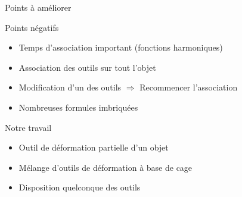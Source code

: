 \documentclass[xcolor=x11names,compress]{beamer}
\renewcommand{\(}{\begin{columns}} \renewcommand{\)}{\end{columns}}
\newcommand{\<}[1]{\begin{column}{#1}} \renewcommand{\>}{\end{column}}
\begin{document}
\begin{frame}{Points à améliorer}
  \begin{alertblock}{Points négatifs}
    \begin{itemize}
      \item Temps d'association important (fonctions harmoniques)
      \item Association des outils sur tout l'objet
      \item Modification d'un des outils $\Rightarrow$ Recommencer
      l'association
      \item Nombreuses formules imbriquées
    \end{itemize}
  \end{alertblock}
  \begin{block}{Notre travail}
    \begin{itemize}
      \item Outil de déformation partielle d'un objet
      \item Mélange d'outils de déformation à base de cage
      \item Disposition quelconque des outils
    \end{itemize}
  \end{block}
\end{frame}
\end{document}
